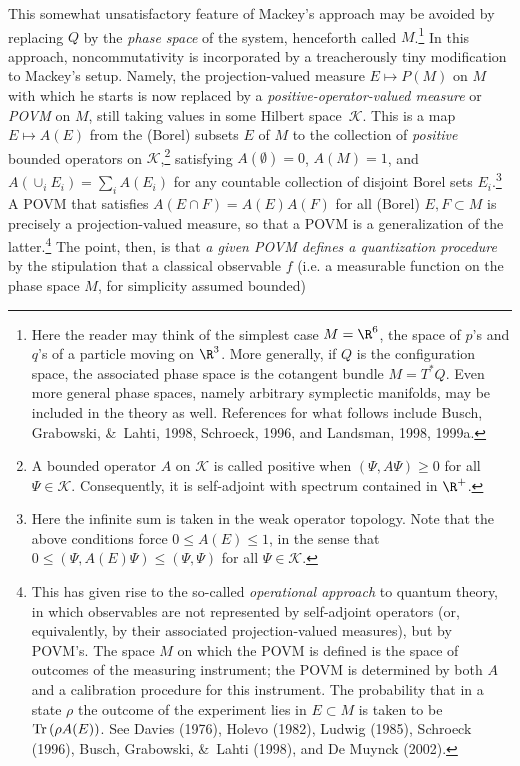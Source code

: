 \documentclass[12pt,titlepage]{article}
\newcommand{\Hs}{Hilbert space} \newcommand{\Bs}{Banach space}
\newcommand{\Tr}{\mbox{\rm Tr}\,} \newcommand{\Ad}{{\rm Ad}}
\newcommand{\rh}{\rho} \newcommand{\sg}{\sigma}
\newcommand{\CK}{{\mathcal K}}   \newcommand{\CL}{{\mathcal L}}
\begin{document}
This somewhat unsatisfactory feature of Mackey's approach may be avoided by replacing $Q$  by the {\it phase space} of the system, henceforth called $M$.\footnote{Here the reader may think of the simplest case $M=\R^6$, the space of $p$'s and $q$'s of a particle moving on $\R^3$. More generally, if $Q$ is the configuration space, the associated phase space is the cotangent bundle $M=T^*Q$. Even more general phase spaces, namely arbitrary symplectic manifolds, may be included  in the theory as well. References for what follows include Busch,  Grabowski, \&\ Lahti, 1998, Schroeck, 1996, and Landsman, 1998, 1999a.  } In this approach, noncommutativity is incorporated by a treacherously  tiny modification to Mackey's setup. Namely, the projection-valued measure $E\mapsto P(M)$ on $M$ with which he starts is now replaced by a {\it positive-operator-valued measure} or {\it POVM} on $M$, still taking values in some \Hs\ $\CK$. This is  a map $E\mapsto A(E)$ from the (Borel)
subsets $E$ of $M$ to the collection of {\it positive} bounded operators on $\CK$,\footnote{A bounded operator $A$ on $\CK$ is called positive when $(\Psi,A\Psi)\geq 0$ for all $\Psi\in\CK$.
Consequently, it is self-adjoint with spectrum contained in $\R^+$.}
satisfying $A(\emptyset)=0$, $A(M)=1$, and 
$A(\cup_i E_i)=\sum_i A(E_i)$ for any countable collection of disjoint Borel sets $E_i$.\footnote{Here the infinite sum is taken in the weak operator topology.
 Note that the above conditions force $0\leq A(E)\leq 1$, in the sense that
$0\leq (\Psi, A(E)\Psi)\leq (\Psi,\Psi)$ for all $\Psi\in\CK$.} A POVM that satisfies
$A(E\cap F)  =  A(E)A(F)$ for all (Borel) $E,F\subset M$ is precisely a projection-valued measure, so that a POVM is a generalization of the latter.\footnote{This has given rise to the so-called {\it operational approach} to quantum theory, in which observables are not represented by self-adjoint operators (or, equivalently, by their associated  projection-valued measures), but by POVM's.  The space $M$ on which the POVM is defined is the space of outcomes of the measuring instrument; the POVM
is determined by both $A$ and a calibration procedure for this instrument.  The probability that in a state $\rh$ the outcome of the experiment lies in $E\subset M$ is taken to be $\Tr (\rh A(E))$. See Davies (1976), Holevo (1982), Ludwig (1985),  Schroeck (1996), Busch,  Grabowski, \&\ Lahti (1998),  and De Muynck (2002).} The point, then, is that {\it a given POVM defines a quantization procedure} by the stipulation that a classical observable $f$
(i.e. a measurable function on the phase space $M$, for simplicity assumed bounded)
\end{document}
